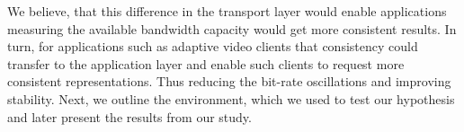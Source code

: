 \documentclass[10pt,sigconf]{acmart}
\begin{document}
We believe, that this difference in the transport layer would enable applications measuring the available bandwidth capacity would get more consistent results. In turn, for applications such as adaptive video clients that consistency could transfer to the application layer and enable such clients to request more consistent representations. Thus reducing the bit-rate oscillations and improving stability. Next, we outline the environment, which we used to test our hypothesis and later present the results from our study.




\end{document}
